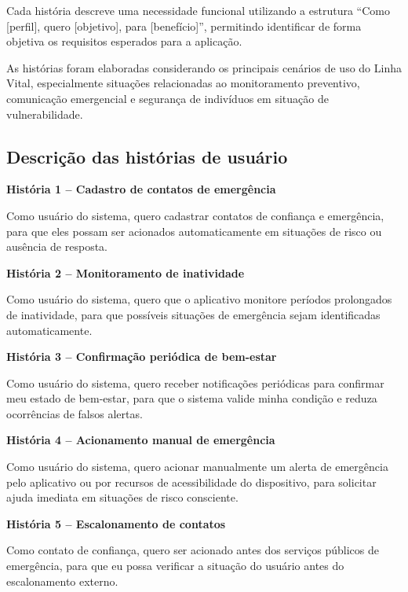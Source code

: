 Cada história descreve uma necessidade funcional utilizando a estrutura “Como [perfil], quero [objetivo], para [benefício]”, permitindo identificar de forma objetiva os requisitos esperados para a aplicação.

As histórias foram elaboradas considerando os principais cenários de uso do Linha Vital, especialmente situações relacionadas ao monitoramento preventivo, comunicação emergencial e segurança de indivíduos em situação de vulnerabilidade.

\subsection{Descrição das histórias de usuário}

\textbf{História 1 – Cadastro de contatos de emergência}

Como usuário do sistema, quero cadastrar contatos de confiança e emergência, para que eles possam ser acionados automaticamente em situações de risco ou ausência de resposta.

\bigskip

\textbf{História 2 – Monitoramento de inatividade}

Como usuário do sistema, quero que o aplicativo monitore períodos prolongados de inatividade, para que possíveis situações de emergência sejam identificadas automaticamente.

\bigskip

\textbf{História 3 – Confirmação periódica de bem-estar}

Como usuário do sistema, quero receber notificações periódicas para confirmar meu estado de bem-estar, para que o sistema valide minha condição e reduza ocorrências de falsos alertas.

\bigskip

\textbf{História 4 – Acionamento manual de emergência}

Como usuário do sistema, quero acionar manualmente um alerta de emergência pelo aplicativo ou por recursos de acessibilidade do dispositivo, para solicitar ajuda imediata em situações de risco consciente.

\bigskip

\textbf{História 5 – Escalonamento de contatos}

Como contato de confiança, quero ser acionado antes dos serviços públicos de emergência, para que eu possa verificar a situação do usuário antes do escalonamento externo.

\bigskip

